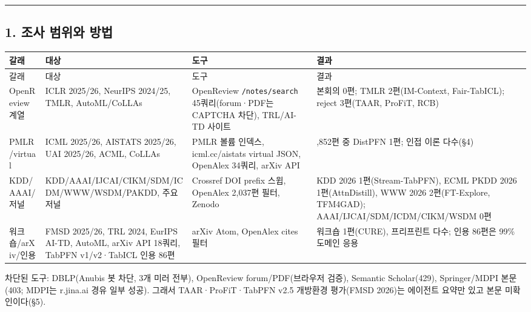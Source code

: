 \medskip\hrule\medskip
\subsection{1. 조사 범위와 방법}
\begingroup
\footnotesize
\begin{longtable}{>{\raggedright\arraybackslash}p{}>{\raggedright\arraybackslash}p{}>{\raggedright\arraybackslash}p{}>{\raggedright\arraybackslash}p{}}
\toprule
갈래 & 대상 & 도구 & 결과 \\ \midrule
\endfirsthead
갈래 & 대상 & 도구 & 결과 \\ \midrule
\endhead
{}OpenReview 계열 & ICLR 2025/\allowbreak{}26, NeurIPS 2024/\allowbreak{}25, TMLR, AutoML/\allowbreak{}CoLLAs & OpenReview \texttt{/\allowbreak{}\allowbreak{}notes/\allowbreak{}\allowbreak{}s\allowbreak{}earch} 45쿼리(forum·PDF는 CAPTCHA 차단), TRL/\allowbreak{}AI-TD 사이트 & 본회의 0편; TMLR 2편(IM-Context, Fair-TabICL); reject 3편(TAAR, ProFiT, RCB) \\
{}PMLR/\allowbreak{}virtual & ICML 2025/\allowbreak{}26, AISTATS 2025/\allowbreak{}26, UAI 2025/\allowbreak{}26, ACML, CoLLAs & PMLR 볼륨 인덱스, icml.cc/\allowbreak{}aistats virtual JSON, OpenAlex 34쿼리, arXiv API & 11,852편 중 DistPFN 1편; 인접 이론 다수(§4) \\
{}KDD/\allowbreak{}AAAI/\allowbreak{}저널 & KDD/\allowbreak{}AAAI/\allowbreak{}IJCAI/\allowbreak{}CIKM/\allowbreak{}SDM/\allowbreak{}ICDM/\allowbreak{}WWW/\allowbreak{}WSDM/\allowbreak{}PAKDD, 주요 저널 & Crossref DOI prefix 스윕, OpenAlex 2,037편 필터, Zenodo & KDD 2026 1편(Stream-TabPFN), ECML PKDD 2026 1편(AttnDistill), WWW 2026 2편(FT-Explore, TFM4GAD); AAAI/\allowbreak{}IJCAI/\allowbreak{}SDM/\allowbreak{}ICDM/\allowbreak{}CIKM/\allowbreak{}WSDM 0편 \\
{}워크숍/\allowbreak{}arXiv/\allowbreak{}인용 & FMSD 2025/\allowbreak{}26, TRL 2024, EurIPS AI-TD, AutoML, arXiv API 18쿼리, TabPFN v1/\allowbreak{}v2·TabICL 인용 86편 & arXiv Atom, OpenAlex cites 필터 & 워크숍 1편(CURE), 프리프린트 다수; 인용 86편은 99\% 도메인 응용 \\
\bottomrule
\end{longtable}
\endgroup
차단된 도구: DBLP(Anubis 봇 차단, 3개 미러 전부), OpenReview forum/\allowbreak{}PDF(브라우저 검증), Semantic Scholar(429), Springer/\allowbreak{}MDPI 본문(403; MDPI는 r.jina.ai 경유 일부 성공). 그래서 TAAR·ProFiT·TabPFN v2.5 개방환경 평가(FMSD 2026)는 에이전트 요약만 있고 본문 미확인이다(§5).


